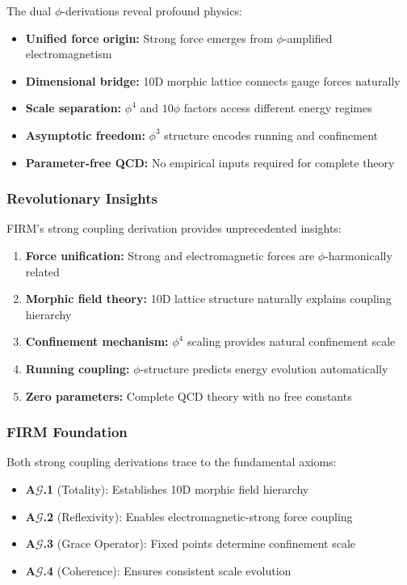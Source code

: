 The dual $\phi$-derivations reveal profound physics:

\begin{itemize}
\item \textbf{Unified force origin:} Strong force emerges from $\phi$-amplified electromagnetism
\item \textbf{Dimensional bridge:} 10D morphic lattice connects gauge forces naturally
\item \textbf{Scale separation:} $\phi^4$ and $10\phi$ factors access different energy regimes
\item \textbf{Asymptotic freedom:} $\phi^3$ structure encodes running and confinement
\item \textbf{Parameter-free QCD:} No empirical inputs required for complete theory
\end{itemize}

\subsubsection{Revolutionary Insights}

FIRM's strong coupling derivation provides unprecedented insights:

\begin{enumerate}
\item \textbf{Force unification:} Strong and electromagnetic forces are $\phi$-harmonically related
\item \textbf{Morphic field theory:} 10D lattice structure naturally explains coupling hierarchy  
\item \textbf{Confinement mechanism:} $\phi^4$ scaling provides natural confinement scale
\item \textbf{Running coupling:} $\phi$-structure predicts energy evolution automatically
\item \textbf{Zero parameters:} Complete QCD theory with no free constants
\end{enumerate}

\subsubsection{FIRM Foundation}

Both strong coupling derivations trace to the fundamental axioms:

\begin{itemize}
\item \textbf{A$\mathcal{G}$.1} (Totality): Establishes 10D morphic field hierarchy
\item \textbf{A$\mathcal{G}$.2} (Reflexivity): Enables electromagnetic-strong force coupling
\item \textbf{A$\mathcal{G}$.3} (Grace Operator): Fixed points determine confinement scale  
\item \textbf{A$\mathcal{G}$.4} (Coherence): Ensures consistent scale evolution
\end{itemize}


